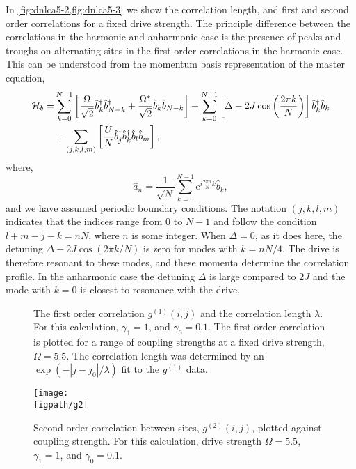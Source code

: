 In \cref{fig:dnlca5-2,fig:dnlca5-3} we show the correlation length, and first and second order correlations for a fixed drive strength. The principle difference between the correlations in the harmonic and anharmonic case is the presence of peaks and troughs on alternating sites in the first-order correlations in the harmonic case. This can be understood from the momentum basis representation of the master equation,
\begin{align}
	\mathcal{H}_{b} = &\sum_{k=0}^{N-1} \left[ \frac{\Omega}{\sqrt{2}}\hat{b}_{k}^{\dagger}\hat{b}_{N-k}^{\dagger} + \frac{\Omega^{*}}{\sqrt{2}}\hat{b}_{k}\hat{b}_{N-k} \right] + \sum_{k=0}^{N-1} \left[\Delta - 2J\cos\left(\frac{2\pi k}{N}\right)\right]\hat{b}_{k}^{\dagger}\hat{b}_{k} \notag \\ 
	&+ \sum_{(j,k,l,m)} \left[ \frac{U}{N} \hat{b}_{j}^{\dagger}\hat{b}_{k}^{\dagger}\hat{b}_{l}\hat{b}_{m} \right], 
	\label{eq:dnlca5-1}
\end{align}
where,
\begin{equation}
	\hat{a}_{n} = \frac{1}{\sqrt{N}} \sum_{k=0}^{N-1} \mathrm{e}^{i\frac{2\pi n}{N}k}\hat{b}_{k},
	\label{eq:dnlca5-2}
\end{equation}
and we have assumed periodic boundary conditions. The notation \((j,k,l,m)\) indicates that the indices range from \(0\) to \(N-1\) and follow the condition \(l+m-j-k = nN\), where \(n\) is some integer. When \(\Delta = 0\), as it does here, the detuning \(\Delta - 2J\cos (2 \pi k/N)\) is zero for modes with \(k = nN/4\). The drive is therefore resonant to these modes, and these momenta determine the correlation profile. In the anharmonic case the detuning \(\Delta\) is large compared to \(2J\) and the mode with \(k=0\) is closest to resonance with the drive.

\begin{figure}[ht]
	 \hfill
	\caption{\label{fig:dnlca5-2} The first order correlation \(g^{(1)}(i,j)\) and the correlation length $\lambda$. For this calculation, \(\gamma_{1} = 1\), and \(\gamma_{0} = 0.1\). The first order correlation is plotted for a range of coupling strengths at a fixed drive strength, \(\Omega = 5.5\). The correlation length was determined by an \(\exp(- |j-j_{0}|/\lambda)\) fit to the \(g^{(1)}\) data.}
\end{figure}
%
\begin{figure}[ht]
	\centering
	\texttt{[image: \\figpath/g2]}
	\caption{\label{fig:dnlca5-3} Second order correlation between sites, \(g^{(2)}(i,j)\), plotted against coupling strength. For this calculation, drive strength \(\Omega = 5.5\), \(\gamma_{1} = 1\), and \(\gamma_{0} = 0.1\).}
\end{figure}

